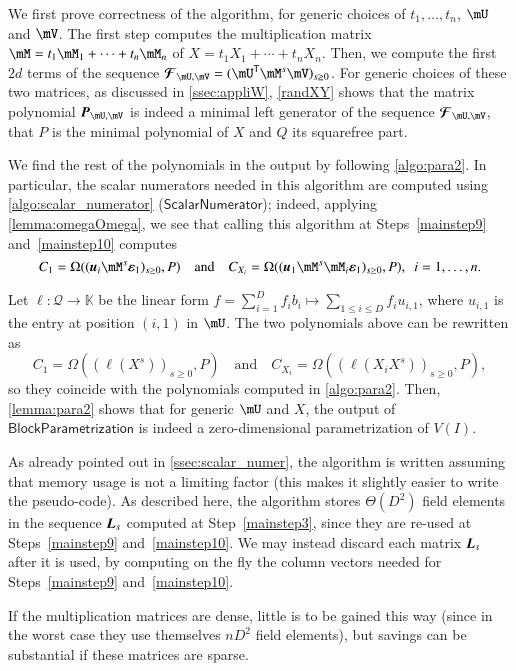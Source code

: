 \documentclass[final,1p,times,authoryear]{elsarticle}
\newcommand{\mat}[1]{\bm{\MakeUppercase{#1}}} %
\newcommand{\row}[1]{\bm{\MakeLowercase{#1}}} %
\newcommand{\col}[1]{\bm{\MakeLowercase{#1}}} %
\newcommand{\seq}{\mat{\mathcal{F}}} %
\newcommand{\minpoly}{P}
\newcommand{\mainalgoname}{\mathsf{ BlockParametrization}}
\newcommand{\lf}{X}
\newcommand{\residueI}{\mathscr{Q}}
\newcommand{\sqfree}{Q}
\newcommand{\trsp}[1]{#1^{\mathsf{T}}} %
\def\K{\mathbb{K}}
\def\K {\ensuremath{\mathbb{K}}}
\newcommand{\mUt}{\trsp{\mU}}
\begin{document}
We first prove correctness of the algorithm, for generic choices of
$t_1,\dots,t_n$, $\mU$ and $\mV$. The first step computes the
multiplication matrix $\mM=t_1 \mM_1 + \cdots + t_n \mM_n$ of $\lf=t_1
X_1 + \cdots + t_n X_n$.
Then, we compute the first $2d$ terms of the sequence $\seq_{\mU,\mV}=
(\mUt\mM^s\mV)_{s\ge 0}$. For generic choices of these two
matrices, as discussed in \cref{ssec:appliW}, \cref{randXY} shows that
the matrix polynomial $\mat{P}_{\mU,\mV}$ is indeed a minimal left
generator of the sequence $\seq_{\mU,\mV}$, that $\minpoly$ is the minimal 
polynomial of $\lf$ and $\sqfree$ its squarefree part.

We find the rest of the polynomials in the output by following
\cref{algo:para2}. In particular, the scalar numerators
needed in this algorithm are computed using \cref{algo:scalar_numerator}
($\mathsf{ScalarNumerator}$); indeed, applying \cref{lemma:omegaOmega},
we see that calling this algorithm
at Steps~\ref{mainstep9} and~\ref{mainstep10}
computes $$C_1 = \Omega((\row{u}_i \mM^s \col{\varepsilon}_1)_{s \ge
0}, \minpoly) \quad\text{and}\quad C_{X_i} = \Omega((\row{u}_1 \mM^s
\mM_i \col{\varepsilon}_1)_{s \ge 0}, \minpoly),\ \ i=1,\dots,n.$$ 

Let $\ell:\residueI \to \K$ be the linear form $f = \sum_{i=1}^D f_i b_i \mapsto 
\sum_{1 \le i \le D} f_i u_{i,1}$, where $u_{i,1}$ is the entry at position
$(i,1)$ in $\mU$. The two polynomials above can be rewritten
as 
$$C_1 = \Omega( (\ell(X^s))_{s \ge 0}, \minpoly) \quad\text{and}\quad
C_{X_i} = \Omega( (\ell(X_i X^s))_{s \ge 0}, \minpoly),$$ so they
coincide with the polynomials computed in \cref{algo:para2}.  Then,
\cref{lemma:para2} shows that for generic $\mU$ and $\lf$, the output
of $\mainalgoname$
is indeed a zero-dimensional parametrization of $V(I)$.  

\begin{remark}
  As already pointed out in \cref{ssec:scalar_numer}, the algorithm is
  written assuming that memory usage is not a limiting factor (this
  makes it slightly easier to write the pseudo-code). As described
  here, the algorithm stores $\Theta(D^2)$ field elements in the
  sequence $\mat{L}_s$ computed at Step~\ref{mainstep3}, since they
  are re-used at Steps~\ref{mainstep9} and~\ref{mainstep10}.  We may
  instead discard each matrix $\mat{L}_s$ after it is used, by
  computing on the fly the column vectors needed for Steps~\ref{mainstep9}
  and~\ref{mainstep10}.

  If the multiplication matrices are dense, little is to be gained
  this way (since in the worst case they use themselves $n D^2$ field elements),
  but savings can be substantial if these  matrices are sparse.
\end{remark}
\end{document}
